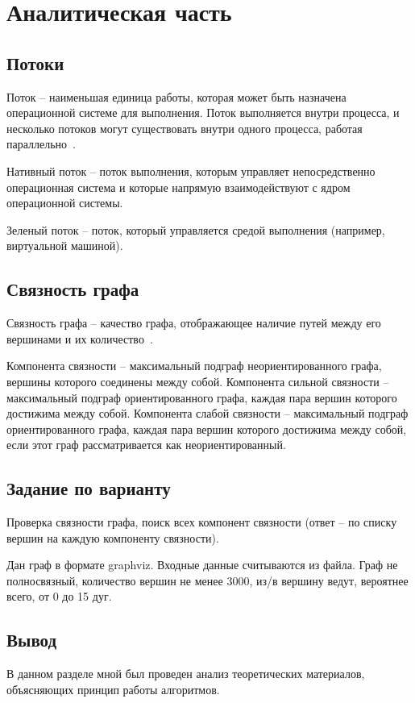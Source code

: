 \chapter{Аналитическая часть}

\section{Потоки}

Поток -- наименьшая единица работы, которая может быть назначена операционной системе для выполнения. Поток выполняется внутри процесса, и несколько потоков могут существовать внутри одного процесса, работая параллельно~\cite{lit3}. 

Нативный поток -- поток выполнения, которым управляет непосредственно операционная система и которые напрямую взаимодействуют с ядром операционной системы. 

Зеленый поток -- поток, который управляется средой выполнения (например, виртуальной машиной).

\section{Связность графа}

Связность графа -- качество графа, отображающее наличие путей между его вершинами и их количество~\cite{lit2}.

Компонента связности -- максимальный подграф неориентированного графа, вершины которого соединены между собой. 
Компонента сильной связности -- максимальный подграф ориентированного графа, каждая пара вершин которого достижима между собой.
Компонента слабой связности -- максимальный подграф ориентированного графа, каждая пара вершин которого достижима между собой, если этот граф рассматривается как неориентированный.

\section{Задание по варианту}

Проверка связности графа, поиск всех компонент связности (ответ – по списку вершин на каждую компоненту связности).

Дан граф в формате graphviz. Входные данные считываются из файла. Граф не полносвязный, количество вершин не менее 3000, из/в вершину ведут, вероятнее всего, от 0 до 15 дуг.

\section*{Вывод}

В данном разделе мной был проведен анализ теоретических материалов, объясняющих принцип работы алгоритмов.

\clearpage
